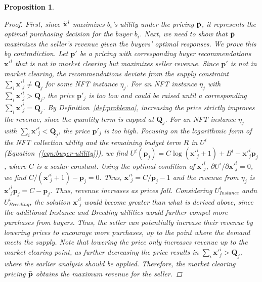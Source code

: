 \documentclass[conference]{IEEEtran}
\newcommand{\1}[1]{\mathds{1}\left[#1\right]}
\theoremstyle{plain}
\newtheorem{proposition}{Proposition}
\begin{document}
\begin{proposition}
{\begin{proof}
        First, since $\Tilde{\mathbf{x}}^i$ maximizes $b_i$’s utility under the pricing $\Tilde{\mathbf{p}}$, it represents the optimal purchasing decision for the buyer $b_i$. Next, we need to show that $\Tilde{\mathbf{p}}$ maximizes the seller's revenue given the buyers' optimal responses. We prove this by contradiction. Let $\mathbf{p}'$ be a pricing with corresponding buyer recommendations $\mathbf{x}'^{i}$ that is not in market clearing but maximizes seller revenue. Since $\mathbf{p}'$ is not in market clearing, the recommendations deviate from the supply constraint $\sum_i\mathbf{x}'^{i}_j \neq \mathbf{Q}_j$ for some NFT instance $\eta_j$. For an NFT instance $\eta_j$ with $\sum_i\mathbf{x}'^{i}_j > \mathbf{Q}_j$, the price $\mathbf{p}'_j$ is too low and could be raised until a corresponding $\sum_i\mathbf{x}'^{i}_j = \mathbf{Q}_j$. By Definition~\ref{def:problema}, increasing the price strictly improves the revenue, since the quantity term is capped at $\mathbf{Q}_j$. For an NFT instance $\eta_j$ with $\sum_i\mathbf{x}'^{i}_j < \mathbf{Q}_j$, the price $\mathbf{p}'_j$ is too high. Focusing on the logarithmic form of the NFT collection utility and the remaining budget term $R$ in $U^i$ (Equation~(\ref{eqn:buyer-utility})), we find $U^{i}(\mathbf{p}_j) = C\log(\mathbf{x}'^{i}_j+1) + B^i- \mathbf{x}'^{i}_j\mathbf{p}_j$, where $C$ is a scalar constant. Using the optimal condition of $\mathbf{x}'^{i}_j$, $\partial U^{i}/\partial \mathbf{x}'^{i}_j = 0$, we find $C/(\mathbf{x}'^{i}_j+1) - \mathbf{p}_j = 0$. Thus, $\mathbf{x}'^{i}_j = C/\mathbf{p}_j - 1$ and the revenue from $\eta_j$ is $\mathbf{x}'^{i}_j\mathbf{p}_j = C - \mathbf{p}_j$. Thus, revenue increases as prices fall. Considering $U^i_\textit{Instance}$ andn $U^i_\textit{Breeding}$, the solution $\mathbf{x}'^{i}_j$ would become greater than what is derived above, since the additional Instance and Breeding utilities would further compel more purchases from buyers. Thus, the seller can potentially increase their revenue by lowering prices to encourage more purchases, up to the point where the demand meets the supply. Note that lowering the price only increases revenue up to the market clearing point, as further decreasing the price results in $\sum_i\mathbf{x}'^{i}_j > \mathbf{Q}_j$, where the earlier analysis should be applied. Therefore, the market clearing pricing $\Tilde{\mathbf{p}}$ obtains the maximum revenue for the seller.
    \end{proof}
    }
\end{proposition}
\end{document}
